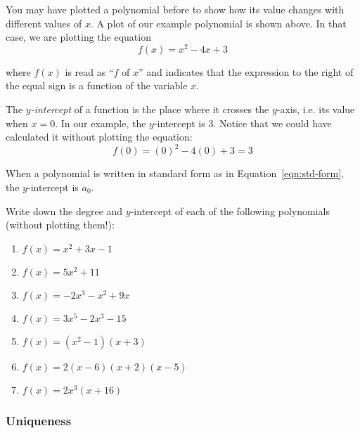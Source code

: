You may have plotted a polynomial before to show how its value changes 
with different values of $x$. A plot of our example polynomial is shown above.
In that case, we are plotting the equation 
\[
    f(x) = x^2 - 4x + 3
\]

where $f(x)$ is read as ``$f$ of $x$'' and indicates that the expression 
to the right of the equal sign is a function of the variable $x$. 

The \emph{$y$-intercept} of a function is the place where it crosses the $y$-axis, 
i.e. its value when $x=0$. In our example, the $y$-intercept is 3. Notice 
that we could have calculated it without plotting the equation:
\[
    f(0) = (0)^2 - 4(0) + 3 = 3
\]



When a polynomial is written in standard form as in Equation~\ref{eqn:std-form}, 
the $y$-intercept is $a_0$.



\begin{exercise}
    Write down the degree and $y$-intercept of each of the following 
    polynomials (without plotting them!):
    \renewcommand{\labelenumi}{(\alph{enumi})} 
    \begin{enumerate}
        \item $f(x) = x^2 + 3x - 1$
        \item $f(x) = 5x^2 + 11$
        \item $f(x) = -2x^3 - x^2 + 9x$
        \item $f(x) = 3x^5 - 2x^3 - 15$
        \item $f(x) = (x^2-1)(x+3)$
        \item $f(x) = 2(x-6)(x+2)(x-5)$
        \item $f(x) = 2x^3(x+16)$
    \end{enumerate}
\end{exercise}

\subsubsection{Uniqueness}\label{sec:unique}

